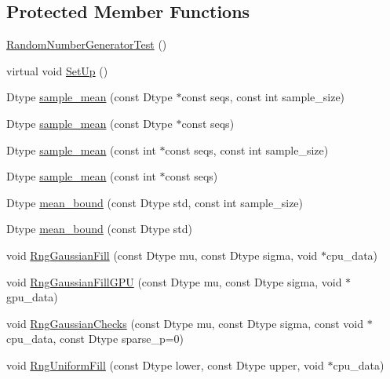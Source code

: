 \subsection*{Protected Member Functions}
\begin{DoxyCompactItemize}
\item 
\hyperlink{classcaffe_1_1_random_number_generator_test_a143706c1ffd4d623c2449f726efb26aa}{Random\+Number\+Generator\+Test} ()
\item 
virtual void \hyperlink{classcaffe_1_1_random_number_generator_test_a0f16d083efcd9e6d096e0f533c3dbb42}{Set\+Up} ()
\item 
Dtype \hyperlink{classcaffe_1_1_random_number_generator_test_a8e47e8eb974abd9f96c6e1421b91001b}{sample\+\_\+mean} (const Dtype $\ast$const seqs, const int sample\+\_\+size)
\item 
Dtype \hyperlink{classcaffe_1_1_random_number_generator_test_a1a5c0259b52a872366cff6e6158c38df}{sample\+\_\+mean} (const Dtype $\ast$const seqs)
\item 
Dtype \hyperlink{classcaffe_1_1_random_number_generator_test_adba69089a2fe1e1f27533ee2a4ffa73f}{sample\+\_\+mean} (const int $\ast$const seqs, const int sample\+\_\+size)
\item 
Dtype \hyperlink{classcaffe_1_1_random_number_generator_test_a43d7d4b986410448721bfa79a73f62b8}{sample\+\_\+mean} (const int $\ast$const seqs)
\item 
Dtype \hyperlink{classcaffe_1_1_random_number_generator_test_a4f23f81c31dc80dca93311ecc4ca8799}{mean\+\_\+bound} (const Dtype std, const int sample\+\_\+size)
\item 
Dtype \hyperlink{classcaffe_1_1_random_number_generator_test_a32a1604e0358efaf9fdfa08ecc102cc0}{mean\+\_\+bound} (const Dtype std)
\item 
void \hyperlink{classcaffe_1_1_random_number_generator_test_a33e80e026c65bfa736e5fadd042cad7b}{Rng\+Gaussian\+Fill} (const Dtype mu, const Dtype sigma, void $\ast$cpu\+\_\+data)
\item 
void \hyperlink{classcaffe_1_1_random_number_generator_test_ac85fa67278accad52bc31d89d220bec9}{Rng\+Gaussian\+Fill\+G\+P\+U} (const Dtype mu, const Dtype sigma, void $\ast$gpu\+\_\+data)
\item 
void \hyperlink{classcaffe_1_1_random_number_generator_test_a1710186e01feea820951e6b31d7ed8d5}{Rng\+Gaussian\+Checks} (const Dtype mu, const Dtype sigma, const void $\ast$cpu\+\_\+data, const Dtype sparse\+\_\+p=0)
\item 
void \hyperlink{classcaffe_1_1_random_number_generator_test_ae645743499118e0d5a4f09df5f617547}{Rng\+Uniform\+Fill} (const Dtype lower, const Dtype upper, void $\ast$cpu\+\_\+data)

\end{DoxyCompactItemize}

